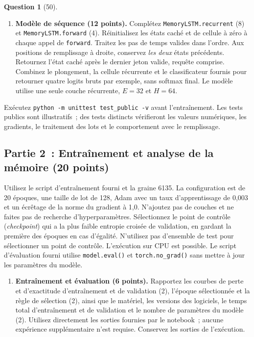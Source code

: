 \documentclass[12pt]{article}
\theoremstyle{definition}
\newtheorem{exercise}{Question}%
\begin{document}
\begin{exercise}[50]
{\begin{enumerate}
\item \textbf{Modèle de séquence (12 points).} Complétez \texttt{MemoryLSTM.recurrent} (8) et
\texttt{MemoryLSTM.forward} (4). Réinitialisez les états caché et de cellule à zéro à chaque appel de
\texttt{forward}. Traitez les pas de temps valides dans l'ordre. Aux positions de remplissage à droite, conservez
\emph{les deux} états précédents. Retournez l'état caché après le dernier jeton valide, requête comprise. Combinez le
plongement, la cellule récurrente et le classificateur fournis pour retourner quatre logits bruts par exemple, sans
softmax final. Le modèle utilise une seule couche récurrente, $E=32$ et $H=64$.
\end{enumerate}

Exécutez \texttt{python -m unittest test\_public -v} avant l'entraînement. Les tests publics sont illustratifs~; des
tests distincts vérifieront les valeurs numériques, les gradients, le traitement des lots et le comportement avec le
remplissage.

\subsection*{Partie 2~: Entraînement et analyse de la mémoire (20 points)}
Utilisez le script d'entraînement fourni et la graine 6135. La configuration est de 20 époques, une taille de lot de
128, Adam avec un taux d'apprentissage de 0,003 et un écrêtage de la norme du gradient à 1,0. N'ajoutez pas de couches
et ne faites pas de recherche d'hyperparamètres. Sélectionnez le point de contrôle (\emph{checkpoint}) qui a la plus
faible entropie croisée de validation, en gardant la première des époques en cas d'égalité. N'utilisez pas d'ensemble
de test pour sélectionner un point de contrôle. L'exécution sur CPU est possible. Le script d'évaluation fourni
utilise \texttt{model.eval()} et \texttt{torch.no\_grad()} sans mettre à jour les paramètres du modèle.

\begin{enumerate}
\item \textbf{Entraînement et évaluation (6 points).} Rapportez les courbes de perte et d'exactitude d'entraînement et
de validation (2), l'époque sélectionnée et la règle de sélection (2), ainsi que le matériel, les versions des
logiciels, le temps total d'entraînement et de validation et le nombre de paramètres du modèle (2). Utilisez
directement les sorties fournies par le notebook~; aucune expérience supplémentaire n'est requise. Conservez les
sorties de l'exécution.


\end{enumerate}}
\end{exercise}
\end{document}
